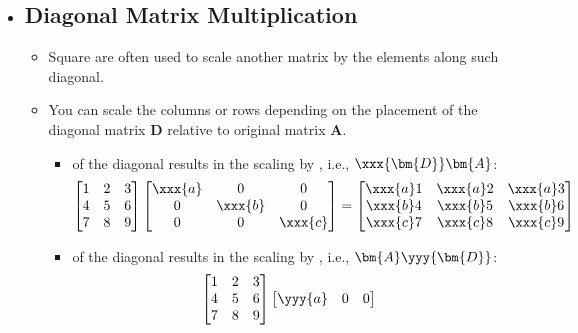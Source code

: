 \begin{itemize}
  \item[] 
  \subsection{Diagonal Matrix Multiplication}\label{Diagonal Matrix Multiplication}
  \begin{itemize}
    \item Square \hyperref[Diagonal and Triagnular Matrices]{} are often used to scale another matrix by the elements along such diagonal.
    \item You can scale the columns or rows depending on the placement of the diagonal matrix \(\bm{D}\) relative to original matrix \(\bm{A}\). 
      \begin{itemize}
        \item {} of the diagonal results in the scaling by , i.e., \(\xxx{\bm{D}}\bm{A}\):
        \[%
        \begin{bmatrix}
        1 & 2 & 3 \\
        4 & 5 & 6 \\
        7 & 8 & 9 
        \end{bmatrix}
        \begin{bmatrix}
        \xxx{a} & 0 & 0 \\
        0 & \xxx{b} & 0 \\
        0 & 0 & \xxx{c}
        \end{bmatrix}
        =
        \begin{bmatrix}
          \xxx{a}1 & \xxx{a}2 & \xxx{a}3 \\
          \xxx{b}4 & \xxx{b}5 & \xxx{b}6 \\
          \xxx{c}7 & \xxx{c}8 & \xxx{c}9 
          \end{bmatrix}
        \]%
        \item {} of the diagonal results in the scaling by , i.e., \(\bm{A}\yyy{\bm{D}}\):
        \[%
        \begin{bmatrix}
        1 & 2 & 3 \\
        4 & 5 & 6 \\
        7 & 8 & 9 
        \end{bmatrix}
        \begin{bmatrix}
        \yyy{a} & 0 & 0 \\

\end{bmatrix}\]
\end{itemize}
\end{itemize}
\end{itemize}
